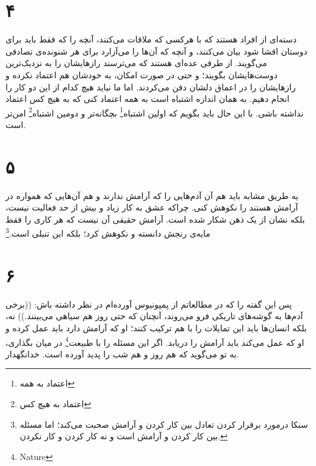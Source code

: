 \documentclass{article}
\begin{document}
    \section*{۴}
    دسته‌ای از افراد هستند که با هرکسی که ملاقات می‌کنند، آنچه را که فقط باید برای دوستان افشا شود بیان می‌کنند، و آنچه که آن‌ها را می‌آزارد برای هر شنونده‌ی تصادفی می‌گویند.
    از طرفی عده‌ای هستند که می‌ترسند رازهایشان را به نزدیک‌ترین دوست‌هایشان بگویند؛ و حتی در صورت امکان، به خودشان هم اعتماد نکرده و رازهایشان را در اعماق دلشان دفن می‌کردند.
    اما ما نباید هیچ کدام از این دو کار را انجام دهیم.
    به همان اندازه اشتباه است به همه اعتماد کنی که به هیچ کس اعتماد نداشته باشی.
    با این حال باید بگویم که اولین اشتباه\footnote{اعتماد به همه} بچگانه‌تر و دومین اشتباه\footnote{اعتماد به هیچ کس} امن‌تر است.
    \section*{۵}
    یه طریق مشابه باید هم آن آدم‌هایی را که آرامش ندارند و هم آن‌هایی که همواره در آرامش هستند را نکوهش کنی.
    چراکه عشق به کار زیاد و بیش از حد فعالیت نیست، بلکه نشان از یک ذهن شکار شده است.
    آرامش حقیقی آن نیست که هر کاری را فقط مایه‌ی رنجش دانسته و نکوهش کرد؛ بلکه این تنبلی است.\footnote{سنکا درمورد برقرار کردن تعادل بین کار کردن و آرامش صحبت می‌کند؛ اما مسئله بین کار کردن و آرامش است و نه کار کردن و کار نکردن.}
    \section*{۶}
    پس این گفته را که در مطالعاتم از پمپونیوس آورده‌ام در نظر داشته باش: ((برخی آدم‌ها به گوشه‌های تاریکی فرو می‌روند، آنچنان که حتی روز هم سیاهی می‌بینند.))
    نه، بلکه انسان‌ها باید این تمایلات را با هم ترکیب کنند؛ او که آرامش دارد باید عمل کرده و او که عمل می‌کند باید آرامش را دریابد.
    اگر این مسئله را با طبیعت\footnote{Nature} در میان بگذاری،‌ به تو می‌گوید که هم روز و هم شب را پدید آورده است.
    خدانگهدار.
\end{document}
